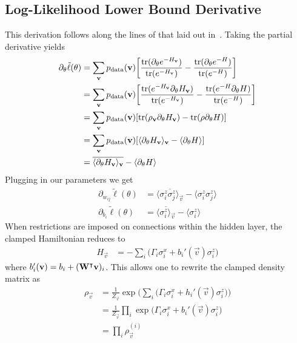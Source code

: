 \subsection{Log-Likelihood Lower Bound Derivative}\label{app:qbm_log_likelihood_lower_bound_derivative}
This derivation follows along the lines of that laid out in~\cite{amin_2018}.
Taking the partial derivative yields
\begin{align}
    \label{eq:qbm_log_likelihood_derivative_lower_bound}
    \partial_\theta \tilde{\ell}(\theta)
        &= \sum_{\mathbf{v}} p_{\text{data}}(\mathbf{v}) \bigg[ \frac{\text{tr}(\partial_\theta e^{-H_{\mathbf{v}}})}{\text{tr}(e^{-H_{\mathbf{v}}})} - \frac{\text{tr}(\partial_\theta e^{-H})}{\text{tr}(e^{-H})} \bigg] \\
        &= \sum_{\mathbf{v}} p_{\text{data}}(\mathbf{v}) \bigg[ \frac{\text{tr}(e^{-H_{\mathbf{v}}} \partial_\theta H_{\mathbf{v}})}{\text{tr}(e^{-H_{\mathbf{v}}})} - \frac{\text{tr}(e^{-H} \partial_\theta H)}{\text{tr}(e^{-H})} \bigg] \\
        &= \sum_{\mathbf{v}} p_{\text{data}}(\mathbf{v}) [ \text{tr}(\rho_{\mathbf{v}} \partial_\theta H_{\mathbf{v}}) - \text{tr}(\rho \partial_\theta H) ] \\
        &= \sum_{\mathbf{v}} p_{\text{data}}(\mathbf{v}) [ \langle \partial_\theta H_{\mathbf{v}} \rangle_{\mathbf{v}} - \langle \partial_\theta H \rangle ] \\
        &= \overline{\langle \partial_\theta H_{\mathbf{v}} \rangle_{\mathbf{v}}} - \langle \partial_\theta H \rangle
\end{align}
Plugging in our parameters we get
\begin{align}
    \partial_{w_{ij}} \tilde{\ell}(\theta)
        &= \overline{\langle \sigma_i^z \sigma_j^z \rangle_\vec{v}} - \langle \sigma_i^z \sigma_j^z \rangle \\
    \partial_{b_i} \tilde{\ell}(\theta)
        &= \overline{\langle \sigma_i^z \rangle_\vec{v}} - \langle \sigma_i^z \rangle
\end{align}
When restrictions are imposed on connections within the hidden layer, the clamped Hamiltonian reduces to
\begin{align}
    H_\vec{v}
        &= -\sum_i \big(\Gamma_i \sigma_i^x + b_i'(\vec{v}) \sigma_i^z\big)
\end{align}
where \( b_i'(\mathbf{v}) = b_i + (\mathbf{W}^\intercal\mathbf{v})_i \).
This allows one to rewrite the clamped density matrix as
\begin{align}
    \rho_\vec{v}
        &= \frac{1}{Z_\vec{v}} \exp\bigg( \sum_i \big(\Gamma_i \sigma_i^x + h_i'(\vec{v}) \sigma_i^z\big) \bigg) \\
        &= \frac{1}{Z_\vec{v}} \prod_i \exp \big(\Gamma_i \sigma_i^x + b_i'(\vec{v}) \sigma_i^z\big) \\
        &= \prod_i \rho_\vec{v}^{(i)}
\end{align}
